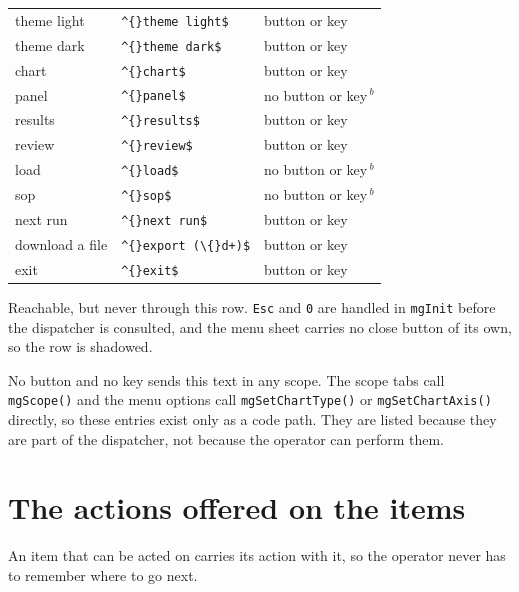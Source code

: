 {\begin{xltabular}{\linewidth}{|X|l|l|}
theme light & \texttt{\textasciicircum\{\}theme light\$} & button or key \\
theme dark & \texttt{\textasciicircum\{\}theme dark\$} & button or key \\
chart & \texttt{\textasciicircum\{\}chart\$} & button or key \\
panel & \texttt{\textasciicircum\{\}panel\$} & no button or key\,$^{b}$ \\
results & \texttt{\textasciicircum\{\}results\$} & button or key \\
review & \texttt{\textasciicircum\{\}review\$} & button or key \\
load & \texttt{\textasciicircum\{\}load\$} & no button or key\,$^{b}$ \\
sop & \texttt{\textasciicircum\{\}sop\$} & no button or key\,$^{b}$ \\
next run & \texttt{\textasciicircum\{\}next run\$} & button or key \\
download a file & \texttt{\textasciicircum\{\}export (\textbackslash\{\}d+)\$} & button or key \\
exit & \texttt{\textasciicircum\{\}exit\$} & button or key \\
\bottomrule
\end{xltabular}}

\begin{description}[leftmargin=2.2em,style=nextline]
\item[$^{a}$] Reachable, but never through this row. \texttt{Esc} and \texttt{0} are
  handled in \texttt{mgInit} before the dispatcher is consulted, and the menu
  sheet carries no close button of its own, so the row is shadowed.
\item[$^{b}$] No button and no key sends this text in any scope. The scope tabs call
  \texttt{mgScope()} and the menu options call \texttt{mgSetChartType()} or
  \texttt{mgSetChartAxis()} directly, so these entries exist only as a code
  path. They are listed because they are part of the dispatcher, not because the
  operator can perform them.
\end{description}


\section{The actions offered on the items}
An item that can be acted on carries its action with it, so the operator never has
to remember where to go next.

